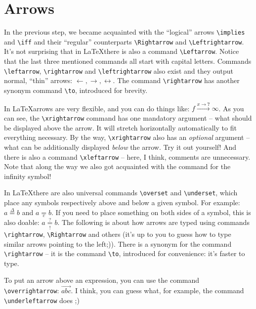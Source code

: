 \section{Arrows}
\par In the previous step, we became acquainted with the ``logical'' arrows \verb"\implies" and \verb"\iff" and their ``regular'' counterparts \verb"\Rightarrow" and \verb"\Leftrightarrow". It's not surprising that in \LaTeX there is also a command \verb"\Leftarrow". Notice that the last three mentioned commands all start with capital letters. Commands \verb"\leftarrow", \verb"\rightarrow" and \verb"\leftrightarrow" also exist and they output normal, ``thin'' arrows: \(\leftarrow,\rightarrow,\leftrightarrow\). The command \verb"\rightarrow" has another synonym command \verb"\to", introduced for brevity.

\par In \LaTeX arrows are very flexible, and you can do things like: \( f\xrightarrow{x\rightarrow 7}\infty \). As you can see, the \verb"\xrightarrow" command has one mandatory argument -- what should be displayed above the arrow. It will stretch horizontally automatically to fit everything necessary. By the way, \verb"\xrightarrow" also has an \emph{optional} argument -- what can be additionally displayed \emph{below} the arrow. Try it out yourself! And there is also a command \verb"\xleftarrow" -- here, I think, comments are unnecessary. Note that along the way we also got acquainted with the command for the infinity symbol!
\par In \LaTeX there are also universal commands \verb"\overset" and \verb"\underset", which place any symbols respectively above and below a given symbol. For example: \( a \overset{\Delta}{=} b \) and \( a \underset{c}{=} b \). If you need to place something on both sides of a symbol, this is also doable: \( a \underset{!}{\overset{?}{=}} b \).
The following is about how arrows are typed using commands \verb"\rightarrow", \verb"\Rightarrow" and others (it's up to you to guess how to type similar arrows pointing to the left;)). There is a synonym for the command \verb"\rightarrow" -- it is the command \verb"\to", introduced for convenience: it's faster to type.

\par To put an arrow above an expression, you can use the command \verb"\overrightarrow": \(\overrightarrow{abc}\). I think, you can guess what, for example, the command \verb"\underleftarrow" does ;)

